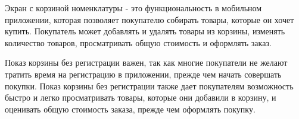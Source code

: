 



Экран с корзиной номенклатуры - это функциональность в мобильном приложении,
которая позволяет покупателю собирать товары, которые он хочет купить.
Покупатель может добавлять и удалять товары из корзины, изменять количество товаров,
просматривать общую стоимость и оформлять заказ.

Показ корзины без регистрации важен,
так как многие покупатели не желают тратить время на регистрацию в приложении,
прежде чем начать совершать покупки.
Показ корзины без регистрации также дает покупателям возможность быстро и легко просматривать товары,
которые они добавили в корзину, и оценивать общую стоимость заказа, прежде чем оформлять покупку.

